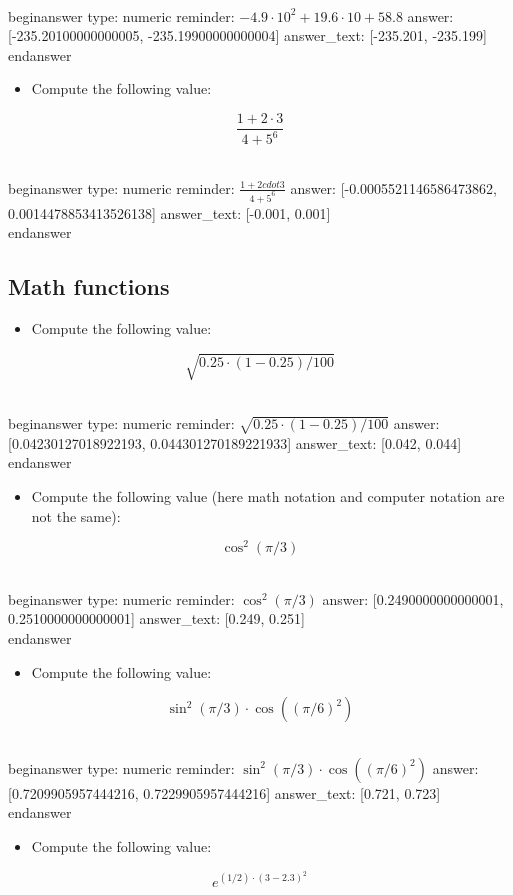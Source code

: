 \documentclass[12pt]{article}
\begin{document}
\\begin{answer}
    type: numeric
    reminder: \( -4.9\cdot 10^2 + 19.6\cdot 10 + 58.8 \)
    answer: [-235.20100000000005, -235.19900000000004]
    answer_text: [-235.201, -235.199] 
\\end{answer}
\begin{itemize}\item Compute the following value:\end{itemize}
$$
\frac{1 + 2\cdot 3}{4 + 5^6}
$$

\\begin{answer}
    type: numeric
    reminder: \( \frac{1 + 2cdot 3}{4 + 5^6} \)
    answer: [-0.0005521146586473862, 0.0014478853413526138]
    answer_text: [-0.001, 0.001] 
\\end{answer}
\subsection{Math functions}\begin{itemize}\item Compute the following value:\end{itemize}
$$
\sqrt{0.25\cdot(1-0.25)/100}
$$

\\begin{answer}
    type: numeric
    reminder: \( \sqrt{0.25\cdot(1-0.25)/100} \)
    answer: [0.04230127018922193, 0.044301270189221933]
    answer_text: [0.042, 0.044] 
\\end{answer}
\begin{itemize}\item Compute the following value (here math notation and computer notation are not the same):\end{itemize}
$$
\cos^2(\pi/3)
$$

\\begin{answer}
    type: numeric
    reminder: \( \cos^2(\pi/3) \)
    answer: [0.2490000000000001, 0.2510000000000001]
    answer_text: [0.249, 0.251] 
\\end{answer}
\begin{itemize}\item Compute the following value:\end{itemize}
$$
\sin^2(\pi/3)  \cdot \cos((\pi/6)^2)
$$

\\begin{answer}
    type: numeric
    reminder: \( \sin^2(\pi/3)  \cdot \cos((\pi/6)^2) \)
    answer: [0.7209905957444216, 0.7229905957444216]
    answer_text: [0.721, 0.723] 
\\end{answer}
\begin{itemize}\item Compute the following value:\end{itemize}
$$
e^{(1/2)\cdot(3 - 2.3)^2}
$$
\end{document}
